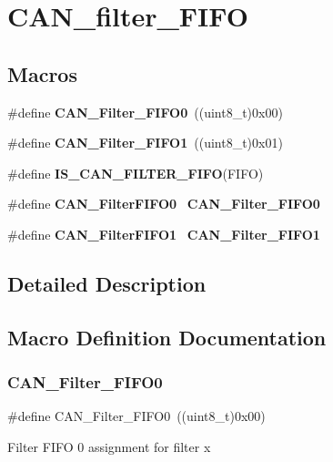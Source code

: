 \section{C\+A\+N\+\_\+filter\+\_\+\+F\+I\+FO}
\label{group__CAN__filter__FIFO}
\subsection*{Macros}
\begin{DoxyCompactItemize}
\item 
\#define \textbf{ C\+A\+N\+\_\+\+Filter\+\_\+\+F\+I\+F\+O0}~((uint8\+\_\+t)0x00)
\item 
\#define \textbf{ C\+A\+N\+\_\+\+Filter\+\_\+\+F\+I\+F\+O1}~((uint8\+\_\+t)0x01)
\item 
\#define \textbf{ I\+S\+\_\+\+C\+A\+N\+\_\+\+F\+I\+L\+T\+E\+R\+\_\+\+F\+I\+FO}(F\+I\+FO)
\item 
\#define \textbf{ C\+A\+N\+\_\+\+Filter\+F\+I\+F\+O0}~\textbf{ C\+A\+N\+\_\+\+Filter\+\_\+\+F\+I\+F\+O0}
\item 
\#define \textbf{ C\+A\+N\+\_\+\+Filter\+F\+I\+F\+O1}~\textbf{ C\+A\+N\+\_\+\+Filter\+\_\+\+F\+I\+F\+O1}
\end{DoxyCompactItemize}


\subsection{Detailed Description}


\subsection{Macro Definition Documentation}
\mbox{\label{group__CAN__filter__FIFO_ga8249c27978ca94676530540b88a6be8f}} 
\subsubsection{C\+A\+N\+\_\+\+Filter\+\_\+\+F\+I\+F\+O0}
{\footnotesize\ttfamily \#define C\+A\+N\+\_\+\+Filter\+\_\+\+F\+I\+F\+O0~((uint8\+\_\+t)0x00)}

Filter F\+I\+FO 0 assignment for filter x 

